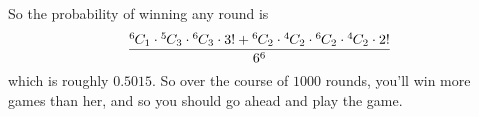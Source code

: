 \documentclass[11pt]{article}
\newcommand*{\permcomb}[4][0mu]{{{}^{#3}\mkern#1#2_{#4}}}
\newcommand*{\comb}[1][-1mu]{\permcomb[#1]{C}}
\begin{document}
\begin{enumerate}
		So the probability of winning any round is 
		$$ \frac{\comb{6}{1} \cdot \comb{5}{3} \cdot \comb{6}{3} \cdot 3! + \comb{6}{2} \cdot \comb{4}{2} \cdot \comb{6}{2} \cdot \comb{4}{2} \cdot 2!}{6^6}  $$
		which is roughly $0.5015$. So over the course of $1000$ rounds, you'll win more games than her, and so you should go ahead and play the game. 

		
	\end{enumerate}
	
	
\end{document}

